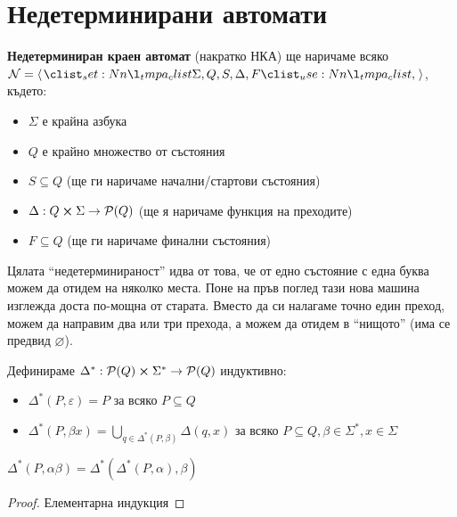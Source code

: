 \section{Недетерминирани автомати}

\begin{definition}
    \textbf{Недетерминиран краен автомат} (накратко НКА) ще наричаме всяко $\mathcal{N} = \opair{\Sigma, Q, S, \Delta, F}$, където:
    \begin{itemize}
        \item $\Sigma$ е крайна азбука
        \item $Q$ е крайно множество от състояния
        \item $S \subseteq Q$ (ще ги наричаме начални/стартови състояния)
        \item $\Delta : Q \cross \Sigma \rightarrow \mathcal{P}(Q)$ (ще я наричаме функция на преходите)
        \item $F \subseteq Q$ (ще ги наричаме финални състояния)
    \end{itemize}
\end{definition}

Цялата ``недетерминираност'' идва от това, че от едно състояние с една буква можем да отидем на няколко места.
Поне на пръв поглед тази нова машина изглежда доста по-мощна от старата.
Вместо да си налагаме точно един преход, можем да направим два или три прехода, а можем да отидем в ``нищото'' (има се предвид $\varnothing$).

\begin{definition}
    Дефинираме $\Delta^* : \mathcal{P}(Q) \cross \Sigma^* \rightarrow \mathcal{P}(Q)$ индуктивно:
    \begin{itemize}
        \item $\Delta^*(P, \varepsilon) = P$ за всяко $P \subseteq Q$
        \item $\Delta^*(P, \beta x) = \bigcup\limits_{q \in \Delta^*(P, \beta)}\Delta(q, x)$ за всяко $P \subseteq Q, \beta \in \Sigma^*, x \in \Sigma$
    \end{itemize}
\end{definition}

\begin{claim}
    $\Delta^*(P, \alpha \beta) = \Delta^*(\Delta^*(P, \alpha), \beta)$
\end{claim}

\begin{proof}
    Елементарна индукция
\end{proof}

